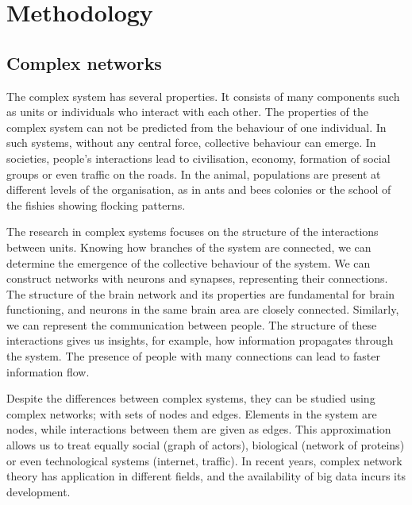 \chapter{Methodology} %

\section{Complex networks}
The complex system has several properties. It consists of many components such as units or individuals who interact with each other. The properties of the complex system can not be predicted from the behaviour of one individual. In such systems, without any central force, collective behaviour can emerge. In societies, people's interactions lead to civilisation, economy, formation of social groups or even traffic on the roads. In the animal, populations are present at different levels of the organisation, as in ants and bees colonies or the school of the fishies showing flocking patterns. \cite{boccaletti2006complex}

The research in complex systems focuses on the structure of the interactions between units. Knowing how branches of the system are connected, we can determine the emergence of the collective behaviour of the system. We can construct networks with neurons and synapses, representing their connections. The structure of the brain network and its properties are fundamental for brain functioning, and neurons in the same brain area are closely connected. Similarly, we can represent the communication between people. The structure of these interactions gives us insights, for example, how information propagates through the system. The presence of people with many connections can lead to faster information flow. 

Despite the differences between complex systems, they can be studied using complex networks; with sets of nodes and edges. Elements in the system are nodes, while interactions between them are given as edges. This approximation allows us to treat equally social (graph of actors), biological (network of proteins) or even technological systems (internet, traffic). In recent years, complex network theory has application in different fields, and the availability of big data incurs its development. \\

